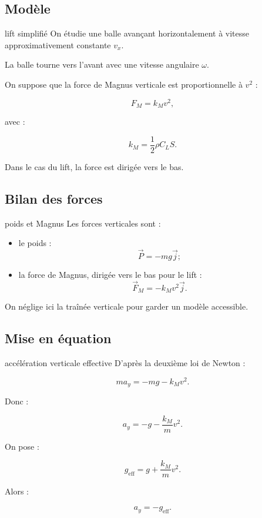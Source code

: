 \documentclass[11pt,a4paper]{article}
\begin{document}
\subsection{Modèle}

\begin{modele}{lift simplifié}
On étudie une balle avançant horizontalement à vitesse approximativement constante $v_x$.

La balle tourne vers l'avant avec une vitesse angulaire $\omega$.

On suppose que la force de Magnus verticale est proportionnelle à $v^2$ :

\[
F_M = k_M v^2,
\]

avec :

\[
k_M=\frac12\rho C_L S.
\]

Dans le cas du lift, la force est dirigée vers le bas.
\end{modele}

\subsection{Bilan des forces}

\begin{bilan}{poids et Magnus}
Les forces verticales sont :
\begin{itemize}
    \item le poids :
    \[
    \vec{P}=-mg\vec{j};
    \]
    \item la force de Magnus, dirigée vers le bas pour le lift :
    \[
    \vec{F}_M=-k_Mv^2\vec{j}.
    \]
\end{itemize}

On néglige ici la traînée verticale pour garder un modèle accessible.
\end{bilan}

\subsection{Mise en équation}

\begin{equationbox}{accélération verticale effective}
D'après la deuxième loi de Newton :

\[
m a_y=-mg-k_Mv^2.
\]

Donc :

\[
a_y=-g-\frac{k_M}{m}v^2.
\]

On pose :

\[
g_{\text{eff}}=g+\frac{k_M}{m}v^2.
\]

Alors :

\[
a_y=-g_{\text{eff}}.
\]
\end{equationbox}
\end{document}
